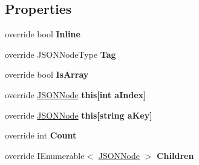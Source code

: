 \subsection*{Properties}
\begin{DoxyCompactItemize}
\item 
override bool {\bfseries Inline}\hypertarget{classSimpleJSON_1_1JSONArray_a97e0ad9f59528a8303a9296294388951}{}\label{classSimpleJSON_1_1JSONArray_a97e0ad9f59528a8303a9296294388951}

\item 
override J\+S\+O\+N\+Node\+Type {\bfseries Tag}\hypertarget{classSimpleJSON_1_1JSONArray_ad0ccf62e03d3bbc69ecf77bdecab120f}{}\label{classSimpleJSON_1_1JSONArray_ad0ccf62e03d3bbc69ecf77bdecab120f}

\item 
override bool {\bfseries Is\+Array}\hypertarget{classSimpleJSON_1_1JSONArray_a79e7d51274f2fce37a049ed4d02e5ebc}{}\label{classSimpleJSON_1_1JSONArray_a79e7d51274f2fce37a049ed4d02e5ebc}

\item 
override \hyperlink{classSimpleJSON_1_1JSONNode}{J\+S\+O\+N\+Node} {\bfseries this\mbox{[}int a\+Index\mbox{]}}\hypertarget{classSimpleJSON_1_1JSONArray_a22e27bd71076fbb2d75b734c57d1ba42}{}\label{classSimpleJSON_1_1JSONArray_a22e27bd71076fbb2d75b734c57d1ba42}

\item 
override \hyperlink{classSimpleJSON_1_1JSONNode}{J\+S\+O\+N\+Node} {\bfseries this\mbox{[}string a\+Key\mbox{]}}\hypertarget{classSimpleJSON_1_1JSONArray_ad57c99e0025a1ee3e36704f5c174f049}{}\label{classSimpleJSON_1_1JSONArray_ad57c99e0025a1ee3e36704f5c174f049}

\item 
override int {\bfseries Count}\hypertarget{classSimpleJSON_1_1JSONArray_a27b9414ec1e214540ac4dfa7157c894f}{}\label{classSimpleJSON_1_1JSONArray_a27b9414ec1e214540ac4dfa7157c894f}

\item 
override I\+Enumerable$<$ \hyperlink{classSimpleJSON_1_1JSONNode}{J\+S\+O\+N\+Node} $>$ {\bfseries Children}\hypertarget{classSimpleJSON_1_1JSONArray_a2a91c5a28b9881398ca6ba52c862647e}{}\label{classSimpleJSON_1_1JSONArray_a2a91c5a28b9881398ca6ba52c862647e}

\end{DoxyCompactItemize}
